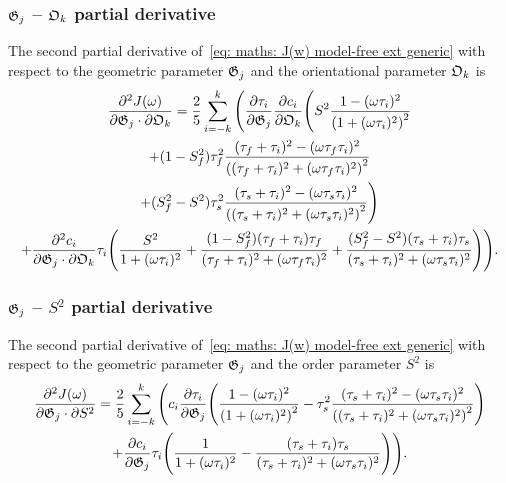 \subsubsection{$\mathfrak{G}_j$ -- $\mathfrak{O}_k$ partial derivative}

The second partial derivative of~\eqref{eq: maths: J(w) model-free ext generic} with respect to the geometric parameter $\mathfrak{G}_j$ and the orientational parameter $\mathfrak{O}_k$ is
\begin{multline}
    \frac{\partial^2 J(\omega)}{\partial \mathfrak{G}_j \cdot \partial \mathfrak{O}_k} = \frac{2}{5} \sum_{i=-k}^k \Bigg(
        \frac{\partial \tau_i}{\partial \mathfrak{G}_j} \frac{\partial c_i}{\partial \mathfrak{O}_k} \Bigg(
            S^2 \frac{1 - (\omega \tau_i)^2}{\left(1 + (\omega \tau_i)^2 \right)^2} \\
            + (1 - S^2_f) \tau_f^2 \frac{(\tau_f + \tau_i)^2 - (\omega \tau_f \tau_i)^2}{\left((\tau_f + \tau_i)^2 + (\omega \tau_f \tau_i)^2 \right)^2} \\
            + (S^2_f - S^2) \tau_s^2 \frac{(\tau_s + \tau_i)^2 - (\omega \tau_s \tau_i)^2}{\left((\tau_s + \tau_i)^2 + (\omega \tau_s \tau_i)^2 \right)^2}
        \Bigg) \\
        +  \frac{\partial^2 c_i}{\partial \mathfrak{G}_j \cdot \partial \mathfrak{O}_k} \tau_i \Bigg(
            \frac{S^2}{1 + (\omega \tau_i)^2}
            + \frac{(1 - S^2_f)(\tau_f + \tau_i)\tau_f}{(\tau_f + \tau_i)^2 + (\omega \tau_f \tau_i)^2}
            + \frac{(S^2_f - S^2)(\tau_s + \tau_i)\tau_s}{(\tau_s + \tau_i)^2 + (\omega \tau_s \tau_i)^2}
        \Bigg)
    \Bigg).
\end{multline}



\subsubsection{$\mathfrak{G}_j$ -- $S^2$ partial derivative}

The second partial derivative of~\eqref{eq: maths: J(w) model-free ext generic} with respect to the geometric parameter $\mathfrak{G}_j$ and the order parameter $S^2$ is
\begin{multline}
    \frac{\partial^2 J(\omega)}{\partial \mathfrak{G}_j \cdot \partial S^2} = \frac{2}{5} \sum_{i=-k}^k \Bigg(
        c_i \frac{\partial \tau_i}{\partial \mathfrak{G}_j} \Bigg(
            \frac{1 - (\omega \tau_i)^2}{\left(1 + (\omega \tau_i)^2 \right)^2}
            - \tau_s^2 \frac{(\tau_s + \tau_i)^2 - (\omega \tau_s \tau_i)^2}{\left((\tau_s + \tau_i)^2 + (\omega \tau_s \tau_i)^2 \right)^2}
        \Bigg) \\
        +  \frac{\partial c_i}{\partial \mathfrak{G}_j} \tau_i \Bigg(
            \frac{1}{1 + (\omega \tau_i)^2}
            - \frac{(\tau_s + \tau_i)\tau_s}{(\tau_s + \tau_i)^2 + (\omega \tau_s \tau_i)^2}
        \Bigg)
    \Bigg).
\end{multline}




